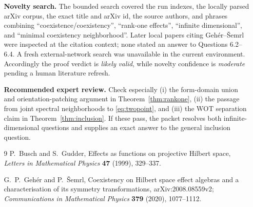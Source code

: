 \documentclass[11pt]{article}
\begin{document}
\textbf{Novelty search.}  The bounded search covered the run indexes, the locally parsed arXiv corpus, the exact title and arXiv id, the source authors, and phrases combining ``coexistence/coexistency'', ``rank-one effects'', ``infinite dimensional'', and ``minimal coexistency neighborhood''.  Later local papers citing Geh\'er--\v Semrl were inspected at the citation context; none stated an answer to Questions 6.2--6.4.  A fresh external-network search was unavailable in the current environment.  Accordingly the proof verdict is \emph{likely valid}, while novelty confidence is \emph{moderate} pending a human literature refresh.

\textbf{Recommended expert review.}  Check especially (i) the form-domain union and orientation-patching argument in Theorem~\ref{thm:rankone}, (ii) the passage from joint spectral neighborhoods to \eqref{eq:twopoint}, and (iii) the WOT separation claim in Theorem~\ref{thm:inclusion}.  If these pass, the packet resolves both infinite-dimensional questions and supplies an exact answer to the general inclusion question.

\begin{thebibliography}{9}
P.~Busch and S.~Gudder,
Effects as functions on projective Hilbert space,
\emph{Letters in Mathematical Physics} \textbf{47} (1999), 329--337.

G.~P.~Geh\'er and P.~\v Semrl,
Coexistency on Hilbert space effect algebras and a characterisation of its symmetry transformations,
arXiv:2008.08559v2; \emph{Communications in Mathematical Physics} \textbf{379} (2020), 1077--1112.
\end{thebibliography}
\end{document}
